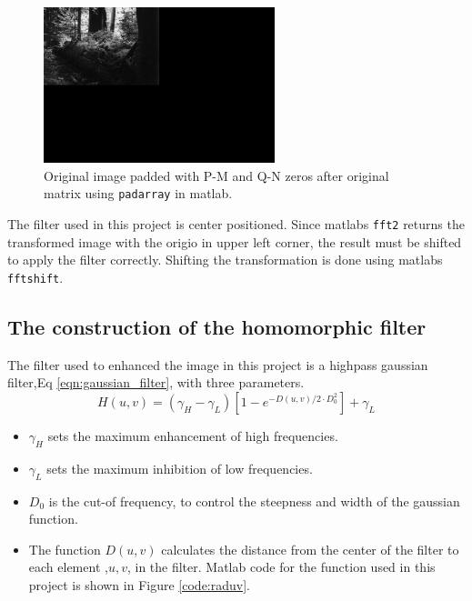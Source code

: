 \begin{figure}[h!]
  \begin{center}
    \includegraphics[width=0.6\textwidth]{pics/zeroPadded.png}
  \end{center}
  \cprotect\caption{Original image padded with P-M and Q-N zeros after original matrix using \verb~padarray~ in matlab.}
  \label{fig:zeropadded}    
\end{figure}

The filter used in this project is center positioned. Since matlabs \verb~fft2~ returns the transformed image with the origio in upper left corner, the result must be shifted to apply the filter correctly. Shifting the transformation is done using matlabs \verb~fftshift~.

\subsection{The construction of the homomorphic filter}
The filter used to enhanced the image in this project is a highpass gaussian filter,Eq \ref{eqn:gaussian_filter}, with three parameters. 
    \begin{equation}
    \label{eqn:gaussian_filter}
      H(u,v) = \left( \gamma_H - \gamma_L \right) \left[ 1 - e^{- D(u,v) /2 \cdot D_0^2}\right] + \gamma_L 
    \end{equation}

\begin{itemize}
  \item $\gamma_H$ sets the maximum enhancement of high frequencies.
  \item $\gamma_L$ sets the maximum inhibition of low frequencies.
  \item $D_0$ is the cut-of frequency, to control the steepness and width of the gaussian function.
  \item The function $D(u,v)$ calculates the distance from the center of the filter to each element ,$u,v$, in the filter. Matlab code for the function used in this project is shown in Figure \ref{code:raduv}.
\end{itemize}

